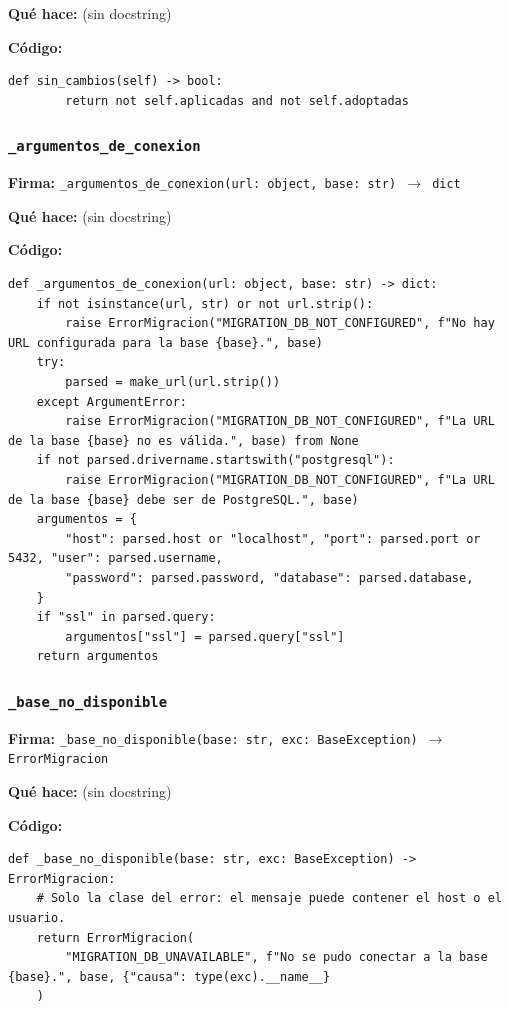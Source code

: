 \documentclass[11pt,a4paper]{article}
\begin{document}
\textbf{Qué hace:} (sin docstring)

\textbf{Código:}
\begin{lstlisting}
def sin_cambios(self) -> bool:
        return not self.aplicadas and not self.adoptadas
\end{lstlisting}

\subsubsection*{\texttt{\_argumentos\_de\_conexion}}
\textbf{Firma:} \texttt{\_argumentos\_de\_conexion(url: object, base: str) $\rightarrow$ dict}

\textbf{Qué hace:} (sin docstring)

\textbf{Código:}
\begin{lstlisting}
def _argumentos_de_conexion(url: object, base: str) -> dict:
    if not isinstance(url, str) or not url.strip():
        raise ErrorMigracion("MIGRATION_DB_NOT_CONFIGURED", f"No hay URL configurada para la base {base}.", base)
    try:
        parsed = make_url(url.strip())
    except ArgumentError:
        raise ErrorMigracion("MIGRATION_DB_NOT_CONFIGURED", f"La URL de la base {base} no es válida.", base) from None
    if not parsed.drivername.startswith("postgresql"):
        raise ErrorMigracion("MIGRATION_DB_NOT_CONFIGURED", f"La URL de la base {base} debe ser de PostgreSQL.", base)
    argumentos = {
        "host": parsed.host or "localhost", "port": parsed.port or 5432, "user": parsed.username,
        "password": parsed.password, "database": parsed.database,
    }
    if "ssl" in parsed.query:
        argumentos["ssl"] = parsed.query["ssl"]
    return argumentos
\end{lstlisting}

\subsubsection*{\texttt{\_base\_no\_disponible}}
\textbf{Firma:} \texttt{\_base\_no\_disponible(base: str, exc: BaseException) $\rightarrow$ ErrorMigracion}

\textbf{Qué hace:} (sin docstring)

\textbf{Código:}
\begin{lstlisting}
def _base_no_disponible(base: str, exc: BaseException) -> ErrorMigracion:
    # Solo la clase del error: el mensaje puede contener el host o el usuario.
    return ErrorMigracion(
        "MIGRATION_DB_UNAVAILABLE", f"No se pudo conectar a la base {base}.", base, {"causa": type(exc).__name__}
    )
\end{lstlisting}
\end{document}
